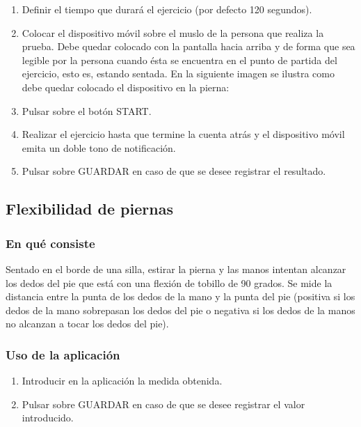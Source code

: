 \begin{enumerate}
\item Definir el tiempo que durará el ejercicio (por defecto 120 segundos). 
\item Colocar el dispositivo móvil sobre el muslo de la persona que realiza la prueba. Debe quedar colocado con la pantalla hacia arriba y de forma que sea legible por la persona cuando ésta se encuentra en el punto de partida del ejercicio, esto es, estando sentada. En la siguiente imagen se ilustra como debe quedar colocado el dispositivo en la pierna:

\item Pulsar sobre el botón START.
\item Realizar el ejercicio hasta que termine la cuenta atrás y el dispositivo móvil emita un doble tono de notificación.
\item Pulsar sobre GUARDAR en caso de que se desee registrar el resultado.
\end{enumerate}

\subsection{Flexibilidad de piernas}

\subsubsection{En qué consiste}

Sentado en el borde de una silla, estirar la pierna y las manos intentan alcanzar los dedos del pie que está con una flexión de tobillo de 90 grados. Se mide la distancia entre la punta de los dedos de la mano y la punta del pie (positiva si los dedos de la mano sobrepasan los dedos del pie o negativa si los dedos de la manos no alcanzan a tocar los dedos del pie).

\subsubsection{Uso de la aplicación}

\begin{enumerate}
\item Introducir en la aplicación la medida obtenida.
\item Pulsar sobre GUARDAR en caso de que se desee registrar el valor introducido.
\end{enumerate}

